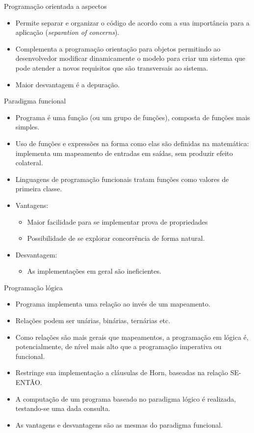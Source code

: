 \documentclass[handout, aspectratio=169]{beamer}
\newcommand{\bi}{\begin{itemize}[<+->]}
\newcommand{\ei}{\end{itemize}}
\begin{document}
\begin{frame}{Programação orientada a aspectos}
    \bi
    \item Permite separar e organizar o código de acordo com a sua importância para a aplicação (\textit{separation of concerns}).
    \item Complementa a programação orientação para objetos permitindo ao desenvolvedor modificar dinamicamente o modelo para criar um sistema que pode atender a novos requisitos que são transversais ao sistema.
    \item Maior desvantagem é a depuração.
    \ei
\end{frame}


\begin{frame}{Paradigma funcional}
    \bi
    \item Programa é uma função (ou um grupo de funções), composta de funções mais simples.
    \item Uso de funções e expressões na forma como elas são definidas na matemática: implementa um mapeamento de entradas em saídas, sem produzir efeito colateral.
    \item Linguagens de programação funcionais tratam funções como valores de primeira classe.
    \item Vantagens:
    \bi
        \item Maior facilidade para se implementar prova de propriedades
        \item Possibilidade de se explorar concorrência de forma natural.
    \ei
    \item Desvantagem:
    \bi
        \item As implementações em geral são ineficientes.
    \ei
    \ei
\end{frame}


\begin{frame}{Programação lógica}
    \bi
    \item Programa implementa uma relação ao invés de um mapeamento.
    \item Relações podem ser unárias, binárias, ternárias etc.
    \item Como relações são mais gerais que mapeamentos, a programação em lógica é, potencialmente, de nível mais alto que a programação imperativa ou funcional.
    \item Restringe sua implementação a cláusulas de Horn, baseadas na relação SE-ENTÃO.
    \item A computação de um programa baseado no paradigma lógico é realizada, testando-se uma dada consulta.
    \item As vantagens e desvantagens são as mesmas do paradigma funcional.
    \ei
\end{frame}
\end{document}
